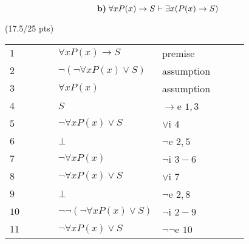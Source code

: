 \documentclass[a4paper,12pt]{article}
\begin{document}
\begin{equation*}
    \textbf{b)} \; \forall x P(x) \rightarrow S \vdash \exists x (P(x)\rightarrow S)\\
\end{equation*}

\hfill \small{(17.5/25 pts)}\\
\begin{tcolorbox}
\centering
\begin{tabular}{l l l l l l l l l}
    $1$  & & & & $\forall x P(x) \rightarrow S$ & premise & & & \\ \cline{2-9}

    $2$  & \multicolumn{1}{|l}{} & & & $\neg (\neg \forall x P(x) \vee S)$ & assumption & & & \multicolumn{1}{l|}{} \\ \cline{3-8}
    
    $3$  & \multicolumn{1}{|l}{} & \multicolumn{1}{|l}{} & & $\forall x P(x)$ & assumption & & \multicolumn{1}{l|}{} & \multicolumn{1}{l|}{} \\
    
    $4$  & \multicolumn{1}{|l}{} & \multicolumn{1}{|l}{} & & $S$ & $\rightarrow$e $1,3$ & & \multicolumn{1}{l|}{} & \multicolumn{1}{l|}{} \\
    
    $5$  & \multicolumn{1}{|l}{} & \multicolumn{1}{|l}{} & & $\neg \forall x P(x) \vee S$ & $\vee$i $4$ & & \multicolumn{1}{l|}{} & \multicolumn{1}{l|}{} \\
    
    $6$  & \multicolumn{1}{|l}{} & \multicolumn{1}{|l}{} & & $\bot$ & $\neg$e $2,5$ & & \multicolumn{1}{l|}{} & \multicolumn{1}{l|}{} \\ \cline{3-8}
    
    $7$  & \multicolumn{1}{|l}{} & & & $\neg \forall x P(x)$ & $\neg$i $3-6$ & & & \multicolumn{1}{l|}{} \\
    
    $8$  & \multicolumn{1}{|l}{} & & & $\neg \forall x P(x) \vee S$ & $\vee$i $7$ & & & \multicolumn{1}{l|}{} \\
    
    $9$  & \multicolumn{1}{|l}{} & & & $\bot$ & $\neg$e $2,8$ & & & \multicolumn{1}{l|}{} \\ \cline{2-9}

    $10$  & & & & $\neg \neg (\neg \forall x P(x) \vee S)$ & $\neg$i $2-9$ & & & \\
    
    $11$  & & & & $\neg \forall x P(x) \vee S$ & $\neg \neg$e $10$ & & & \\ \cline{2-9}
    

\end{tabular}
\end{tcolorbox}
\end{document}
